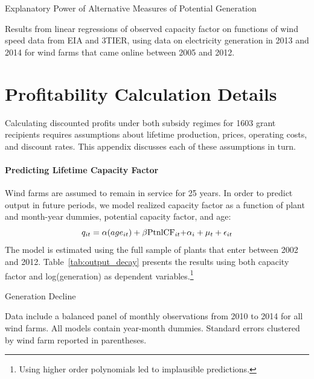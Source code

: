 \documentclass[12pt]{article}
\begin{document}
\begin{table}[H]
\caption{Explanatory Power of Alternative Measures of Potential Generation \label{tab:wind_selection}}
\begin{center} {\footnotesize{}} \end{center}
\footnotesize

Results from linear regressions of observed capacity factor on functions of wind speed data from EIA and 3TIER, using data on electricity generation in 2013 and 2014 for wind farms that came online between 2005 and 2012.
\end{table}


\clearpage
\section{Profitability Calculation Details \label{Appendix:Profitability-calculation-detail}}
\setcounter{figure}{0}  \renewcommand{\thefigure}{B.\arabic{figure}} 
\setcounter{table}{0}  \renewcommand{\thetable}{B.\arabic{table}} 

Calculating discounted profits under both subsidy regimes for 1603 grant recipients requires assumptions about lifetime production, prices, operating costs, and discount rates. This appendix discusses each of these assumptions in turn. 

\paragraph*{Predicting Lifetime Capacity Factor}

Wind farms are assumed to remain in service for 25 years. In order to predict output in future periods, we model realized capacity factor as a function of plant and month-year dummies, potential capacity factor, and age: 
\[
q_{it}=\alpha(age_{it})+\beta\text{PtnlCF\ensuremath{_{it}+}}\alpha_{i}+\mu_{t}+\epsilon_{it}
\]
The model is estimated using the full sample of plants that enter between 2002 and 2012. Table~\ref{tab:output_decay} presents the results using both capacity factor and log(generation) as dependent variables.\footnote{Using higher order polynomials led to implausible predictions.} 

\begin{table}[h]
\begin{centering}
\caption{Generation Decline \label{tab:output_decay}}
\par\end{centering}
\begin{centering}
{\footnotesize{}}
\par\end{centering}{\footnotesize \par}
\footnotesize

Data include a balanced panel of monthly observations from 2010 to 2014 for all wind farms. All models contain year-month dummies. Standard errors clustered by wind farm reported in parentheses.
\end{table}
\end{document}
